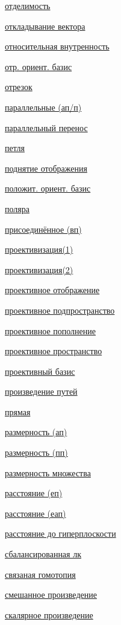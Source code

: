 \documentclass[a4paper,100pt]{article}
\theoremstyle{indented}
\theoremstyle{definition}
\theoremstyle{remark}
\begin{document}
\begin{multicols}{2}
    \hyperlink{s98}{отделимость} \ 
    
    \hyperlink{s4}{откладывание вектора} \ 

    \hyperlink{s97}{относительная внутренность} \ 

    \hyperlink{s81}{отр. ориент. базис} \ 

    \hyperlink{s88}{отрезок} \ 
    
    \hyperlink{s17}{параллельные (ап/п)} \ 
    
    \hyperlink{s16}{параллельный перенос} \ 

    \hyperlink{s112}{петля} \ 

    \hyperlink{s119}{поднятие отображения} \ 

    \hyperlink{s80}{положит. ориент. базис} \ 

    \hyperlink{s105}{поляра} \ 
    
    \hyperlink{s3}{присоединённое (вп)} \ 
    
    \hyperlink{s33}{проективизация(1)} \
    
    \hyperlink{s42}{проективизация(2)} \ 

    \hyperlink{s43}{проективное отображение} \ 
    
    \hyperlink{s35}{проективное подпространство} \ 
    
    \hyperlink{s37}{проективное пополнение} \ 
    
    \hyperlink{s32}{проективное пространство} \ 

    \hyperlink{s45}{проективный базис} \ 

    \hyperlink{s111}{произведение путей} \ 
    
    \hyperlink{s18}{прямая} \ 
    
    \hyperlink{s15}{размерность (ап)} \ 
    
    \hyperlink{s34}{размерность (пп)} \ 

    \hyperlink{s96}{размерность множества} \ 

    \hyperlink{s56}{расстояние (еп)} \ 

    \hyperlink{s85}{расстояние (еап)} \ 

    \hyperlink{s71}{расстояние до гиперплоскости} \ 
    
    \hyperlink{s9}{сбалансированная лк} \ 

    \hyperlink{s109}{связаная гомотопия} \ 

    \hyperlink{s82}{смешанное произведение} \ 

    \hyperlink{s53}{скалярное произведение} \ 


\end{multicols}
\end{document}

